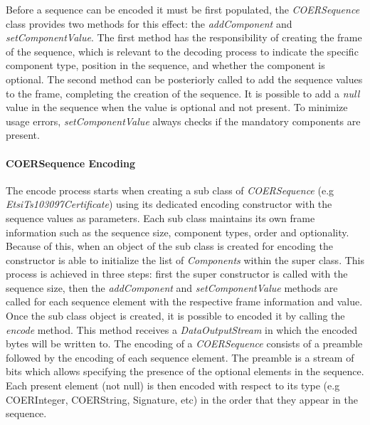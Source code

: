 Before a sequence can be encoded it must be first populated, the \textit{COERSequence} class provides two methods for this effect: the \textit{addComponent} and \textit{setComponentValue}. The first method has the responsibility of creating the frame of the sequence, which is relevant to the decoding process to indicate the specific component type, position in the sequence, and whether the component is optional. The second method can be posteriorly called to add the sequence values to the frame, completing the creation of the sequence. It is possible to add a \textit{null} value in the sequence when the value is optional and not present. To minimize usage errors, \textit{setComponentValue} always checks if the mandatory components are present.



\paragraph{COERSequence Encoding}
The encode process starts when creating a sub class of \textit{COERSequence} (e.g \textit{EtsiTs103097Certificate}) using its dedicated encoding constructor with the sequence values as parameters. Each sub class maintains its own frame information such as the sequence size, component types, order and optionality. Because of this, when an object of the sub class is created for encoding the constructor is able to initialize the list of \textit{Components} within the super class. This process is achieved in three steps: first the super constructor is called with the sequence size, then the \textit{addComponent} and \textit{setComponentValue} methods are called for each sequence element with the respective frame information and value. Once the sub class object is created, it is possible to encoded it by calling the \textit{encode} method. This method receives a \textit{DataOutputStream} in which the encoded bytes will be written to. The encoding of a \textit{COERSequence} consists of a preamble followed by the encoding of each sequence element. The preamble is a stream of bits which allows specifying the presence of the optional elements in the sequence. Each present element (not null) is then encoded with respect to its type (e.g COERInteger, COERString, Signature, etc) in the order that they appear in the sequence. 

